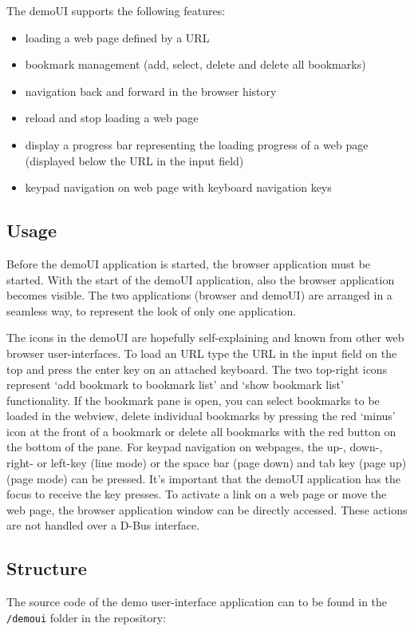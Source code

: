 \documentclass{pelagicore}
\begin{document}
The demoUI supports the following features:
\begin{itemize}
    \item loading a web page defined by a URL
    \item bookmark management (add, select, delete and delete all bookmarks)
    \item navigation back and forward in the browser history
    \item reload and stop loading a web page
    \item display a progress bar representing the loading progress of a web page
          (displayed below the URL in the input field)
    \item keypad navigation on web page with keyboard navigation keys
\end{itemize}

\subsection{Usage}
Before the demoUI application is started, the browser application must be
started. With the start of the demoUI application, also the browser application
becomes visible. The two applications (browser and demoUI) are arranged in a
seamless way, to represent the look of only one application.

The icons in the demoUI are hopefully self-explaining and known from other web
browser user-interfaces. To load an URL type the URL in the input field on the
top and press the enter key on an attached keyboard. The two top-right icons
represent `add bookmark to bookmark list' and `show bookmark list'
functionality. If the bookmark pane is open, you can select bookmarks to be
loaded in the webview, delete individual bookmarks by pressing the red `minus'
icon at the front of a bookmark or delete all bookmarks with the red button on
the bottom of the pane. For keypad navigation on webpages, the up-, down-,
right- or left-key (line mode) or the space bar (page down) and tab key (page
up) (page mode) can be pressed. It's important that the demoUI application has
the focus to receive the key presses. To activate a link on a web page or move
the web page, the browser application window can be directly accessed. These
actions are not handled over a D-Bus interface.

\subsection{Structure}
The source code of the demo user-interface application can to be found in the
{\tt /demoui} folder in the repository:
\end{document}
